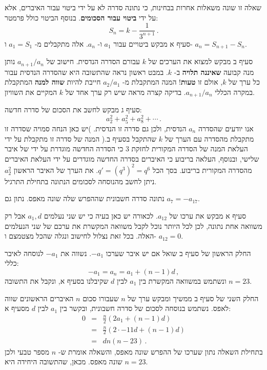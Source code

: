 \documentclass[12pt,a4paper]{article}
\begin{document}
\bigskip

\textbf{}
שאלה זו שונה משאלות אחרות בבחינות, כי נתונה סדרה לא על ידי ביטוי עבור האיברים, אלא על ידי 
\textbf{ביטוי עבור הסכומים}.
בנוסף הביטוי כולל פרמטר:
\[
S_n = k-\frac{1}{3^{n+1}}\,.
\]
סעיף א מבקש ביטויים עבור
$a_1$
ו-%
$a_n$.
אלה מתקבלים מ-%
$a_1=S_1$
ו-%
$a_n=S_{n+1}-S_n$.

סעיף ב מבקש למצוא את הערכים של 
$k$
עבורם הסדרה הנדסית. חישוב של 
$a_{n+1}/a_n$
נותן מנה קבועה
\textbf{שאיננה תלויה}
ב-%
$k$.
במבט ראשון נראה שהתשובה היא שהסדרה הנדסית עבור כל ערך של
$k$,
אולם זו
\textbf{טעות}!
המנה המתקבלת מ-%
$a_2/a_1$
חייבת להיות
\textbf{שווה למנה}
המתקבלת במקרה הכללי
$a_{n+1}/a_n$.
בדיקה קצרה מראה שיש רק ערך אחד של
$k$
המקיים את השוויון.

סעיף ג מבקש לחשב את הסכום של סדרה חדשה:
\[
a_2^2 + a_5^2 + a_8^2 + \cdots\,.
\]
אנו יודעים שהסדרה
$a_n$
הנדסית, ולכן גם סדרה זו הנדסית. )יש כאן הנחה סמויה שסדרה זו מתקבלת מהסדרה עם הערך של
$k$
שהתקבל בסעיף ב.( המנה של סדרה זו מתקבלת על ידי העלאת המנה של הסדרה המקורית לחזקת
$3$
כי הסדרה החדשה מוגדרת על ידי של איבר שלישי, ובנוסף, העלאה בריבוע כי האיברים בסדרה החדשה מוגדרים על ידי העלאת האיברים מהסדרה המקורית בריבוע. בסך הכל
$q'=(q^3)^2=q^6$.
את הערך של האיבר הראשון
$a_2^2$
ניתן לחשב מהנוסחה לסכומים הנתונה בתחילת התרגיל.

\bigskip

\textbf{}
נתונה סדרה חשבונית שההפרש שלה שונה מאפס. נתון גם
$a_7=-a_{17}$.

סעיף א מבקש את ערכו של
$a_{12}$.
לכאורה יש כאן בעיה כי יש שני נעלמים
$a_1, d$
אבל רק משוואה אחת נתונה, לכן לכל היותר נוכל לקבל משוואה המקשרת את ערכם של שני הנעלמים האלה. בכל זאת נצלול לחישוב ונגלה שהכל מצטמצם ו-%
$a_{12}=0$.

החלק הראשון של סעיף ב שואל אם יש איבר שערכו
$-a_1$.
נשווה את
$-a_1$
לנוסחה לאיבר כללי:
\[
-a_1 = a_n = a_1 + (n-1)d\,,
\]
ונשתמש במשוואה המקשרת בין
$a_1$
לבין 
$d$
שקיבלנו בסעיף א, ונקבל את התשובה
$n=23$.

החלק השני של סעיף ב ממשיך ומבקש ערך של 
$n$
שעבורו סכום 
$n$
האיברים הראשונים שווה לאפס. נשתמש בנוסחה לסכום של סדרה חשבונית, ובקשר בין 
$a_1$
לבין
$d$
מסעיף א:
\begin{eqnarray*}
0 &=& \frac{n}{2}(2a_1+(n-1)d)\\
&=& \frac{n}{2}(2\cdot -11d+(n-1)d)\\
&=& d n (n-23)\,.
\end{eqnarray*}
בתחילת השאלה נתון שערכו של ההפרש שונה מאפס, והשאלה אומרת ש-%
$n$
מספר טבעי ולכן שונה מאפס. מכאן, שהתשובה היחידה היא
$n=23$.
\end{document}
